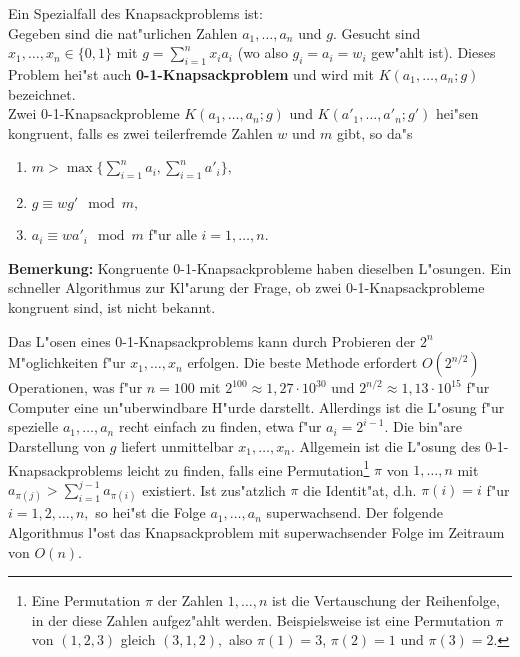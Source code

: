 {Ein Spezialfall des Knapsackproblems ist:\\
Gegeben sind die nat"urlichen Zahlen $ a_1, \dots, a_n $   und $ g .$
Gesucht sind  $ x_1, \dots, x_n \in \{ 0,1\} $  mit $ g = \sum_{i=1}^{n}x_i a_i $  (wo also $ g_i = a_i = w_i $ gew"ahlt ist).
Dieses Problem hei"st auch  {\bf 0-1-Knapsackproblem} und wird mit $ K(a_1, \dots, a_n;g) $  bezeichnet.\\

Zwei 0-1-Knapsackprobleme  $ K(a_1, \dots, a_n;g) $   und  $ K(a'_1, \dots, a'_n;g') $  hei"sen kongruent, falls es zwei  teilerfremde Zahlen $ w $ und $ m $ gibt, so da"s
\begin{enumerate}
    \item $ m > \max \{ \sum_{i=1}^n a_i , \sum_{i=1}^n a'_i \}, $

    \item $ g \equiv wg' \mod m, $

    \item $ a_i \equiv w a'_i \mod m $ f"ur alle $ i=1, \dots, n.$

\end{enumerate}
 
{\bf Bemerkung:}
Kongruente 0-1-Knapsackprobleme haben dieselben L"osungen.
Ein schneller Algorithmus zur Kl"arung der Frage, ob zwei 0-1-Knapsackprobleme kongruent sind, ist nicht bekannt.

Das L"osen eines 0-1-Knapsackproblems kann durch Probieren der $ 2^n $   M"oglichkeiten f"ur $ x_1, \dots, x_n $   erfolgen. Die beste Methode erfordert $ O(2^{n/2}) $  Operationen, was f"ur $ n=100 $  mit $ 2^{100} \approx 1,27 \cdot 10^{30} $  und  $ 2^{n/2} \approx 1,13 \cdot 10^{15} $ f"ur Computer eine un"uberwindbare H"urde darstellt.
Allerdings ist die L"osung f"ur spezielle $ a_1, \dots, a_n $   recht einfach zu finden, etwa f"ur $ a_i = 2^{i-1}. $  Die bin"are Darstellung von $ g $ liefert unmittelbar $ x_1, \dots, x_n$. Allgemein ist die L"osung des 0-1-Knapsackproblems leicht zu finden, falls eine  Permutation\footnote{Eine Permutation $\pi$ der Zahlen $1, \dots, n$ ist die Vertauschung der Reihenfolge, in der
diese Zahlen aufgez"ahlt werden. Beispielsweise ist eine Permutation $\pi$ von $(1,2,3)$ gleich $(3,1,2),$ also $\pi(1) = 3$, $\pi(2) =1$ 
und $\pi(3) = 2$.} 
$ \pi $  von $ 1, \dots, n $  mit $ a_{\pi (j)} > \sum_{i=1}^{j-1} a_{\pi(i)} $  existiert. Ist zus"atzlich $ \pi $ die Identit"at, d.h. $ \pi(i)=i $ f"ur $ i=1,2,\dots,n, $ so hei"st die Folge $ a_1, \dots , a_n $ superwachsend.
Der folgende Algorithmus l"ost das Knapsackproblem mit superwachsender Folge im Zeitraum von $ O(n). $
\newpage
\begin{center}


\end{center}}
